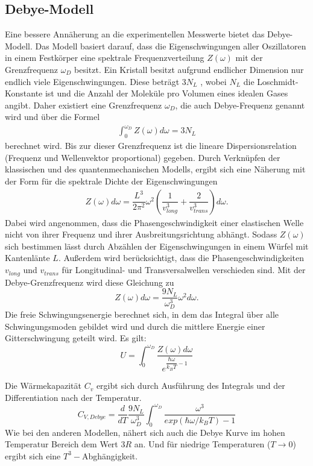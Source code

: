 \documentclass{article}
\begin{document}
\subsection{Debye-Modell}
Eine bessere Annäherung an die  experimentellen Messwerte bietet das Debye-Modell.
Das Modell basiert darauf, dass die Eigenschwingungen aller Oszillatoren in einem Festkörper eine spektrale Frequenzverteilung $Z(\omega)$ mit der  Grenzfrequenz $\omega_D$ besitzt. Ein Kristall besitzt aufgrund endlicher Dimension nur endlich viele Eigenschwingungen. Diese beträgt $ 3 N_L$ , wobei $N_L$ die Loschmidt-Konstante ist und die Anzahl der Moleküle pro Volumen eines idealen Gases angibt. Daher existiert eine Grenzfrequenz $\omega_D$, die auch Debye-Frequenz genannt wird und über die Formel 
\begin{align}
\int_{0}^{\omega_D}Z(\omega)d\omega=3N_L
\end{align}
berechnet wird. Bis zur dieser Grenzfrequenz ist die lineare Dispersionsrelation (Frequenz und Wellenvektor proportional) gegeben. Durch Verknüpfen der klassischen und des quantenmechanischen Modells, ergibt sich eine Näherung mit der Form für die spektrale Dichte der Eigenschwingungen
\begin{align}
Z(\omega)d\omega=\dfrac{L^3}{2\pi^2}\omega^2\left(\dfrac{1}{v_{long}^3}+\dfrac{2}{v_{trans}^3}\right)d\omega.
\end{align}
Dabei wird angenommen, dass die Phasengeschwindigkeit einer elastischen Welle nicht von ihrer Frequenz und ihrer Ausbreitungsrichtung abhängt. Sodass $Z(\omega)$ sich bestimmen lässt durch Abzählen der Eigenschwingungen in einem Würfel mit Kantenlänte $L$. Außerdem wird berücksichtigt, dass die Phasengeschwindigkeiten $v_{long}$ und $v_{trans}$ für Longitudinal- und Transversalwellen verschieden sind.
Mit der Debye-Grenzfrequenz wird diese Gleichung zu 
\begin{equation}
Z(\omega)d\omega=\dfrac{9N_L}{\omega_D^3}\omega^2 d\omega.
\end{equation}
Die freie Schwingungsenergie berechnet sich, in dem das Integral über alle Schwingungsmoden gebildet wird und durch die mittlere Energie einer Gitterschwingung geteilt wird. Es gilt: 
 \begin{equation}
U=\int_{0}^{\omega_D}\dfrac{Z(\omega)d\omega}{e^{\dfrac{\hbar \omega}{k_B T}-1}}
\end{equation}

Die Wärmekapazität $C_v$ ergibt sich durch Ausführung des Integrals und der Differentiation nach der Temperatur. 
\begin{equation}
C_{V,Debye}=\dfrac{d}{dT}\dfrac{9N_L}{\omega_D^3}\int_{0}^{\omega_D}\dfrac{\omega^3}{exp(\hbar\omega/k_BT)-1}
\end{equation}
Wie bei den anderen Modellen, nähert sich auch die Debye Kurve im hohen Temperatur Bereich dem Wert $3R$ an. Und für niedrige Temperaturen ($T\rightarrow 0$) ergibt sich eine $T^3-$Abghängigkeit.
\end{document}
